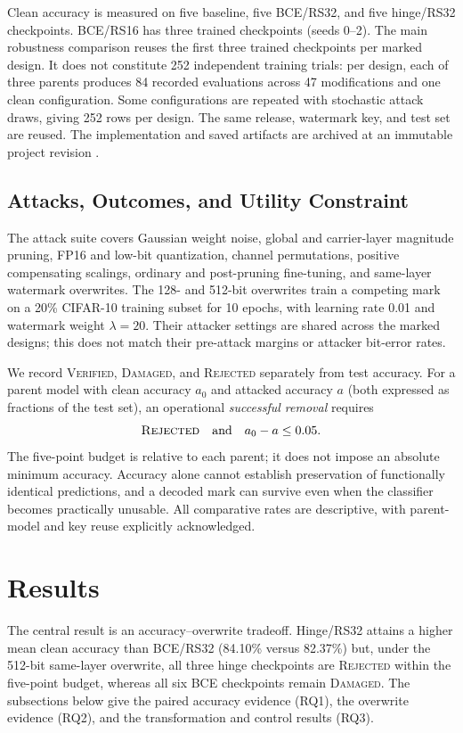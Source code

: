 \documentclass[conference]{IEEEtran}
\begin{document}
Clean accuracy is measured on five baseline, five BCE/RS32, and five
hinge/RS32 checkpoints. BCE/RS16 has three trained checkpoints (seeds 0--2).
The main robustness comparison reuses the first three trained checkpoints
per marked design. It does not constitute 252 independent training trials:
per design, each of three parents produces 84 recorded evaluations across
47 modifications and one clean configuration. Some configurations are
repeated with stochastic attack draws, giving 252 rows per design. The same
release, watermark key, and test set are reused. The implementation and saved
artifacts are archived at an immutable project revision \cite{projectResults}.

\subsection{Attacks, Outcomes, and Utility Constraint}
The attack suite covers Gaussian weight noise, global and carrier-layer
magnitude pruning, FP16 and low-bit quantization, channel permutations,
positive compensating scalings, ordinary and post-pruning fine-tuning, and
same-layer watermark overwrites. The 128- and 512-bit overwrites train a
competing mark on a 20\% CIFAR-10 training subset for 10 epochs, with learning
rate 0.01 and watermark weight $\lambda=20$. Their attacker settings are
shared across the marked designs; this does not match their pre-attack
margins or attacker bit-error rates.

We record \textsc{Verified}, \textsc{Damaged}, and \textsc{Rejected} separately
from test accuracy. For a parent model with clean accuracy $a_0$ and attacked
accuracy $a$ (both expressed as fractions of the test set), an operational
\emph{successful removal} requires
\begin{equation}
 \textsc{Rejected}\quad\text{and}\quad a_0-a\le0.05.
 \label{eq:removal}
\end{equation}
The five-point budget is relative to each parent; it does not impose an
absolute minimum accuracy. Accuracy alone cannot establish preservation of
functionally identical predictions, and a decoded mark can survive even when
the classifier becomes practically unusable. All comparative rates are
descriptive, with parent-model and key reuse explicitly acknowledged.

\section{Results}
\label{sec:results}
The central result is an accuracy--overwrite tradeoff. Hinge/RS32 attains a
higher mean clean accuracy than BCE/RS32 (84.10\% versus 82.37\%) but, under
the 512-bit same-layer overwrite, all three hinge checkpoints are
\textsc{Rejected} within the five-point budget, whereas all six BCE
checkpoints remain \textsc{Damaged}. The subsections below give the paired
accuracy evidence (RQ1), the overwrite evidence (RQ2), and the transformation
and control results (RQ3).
\end{document}
